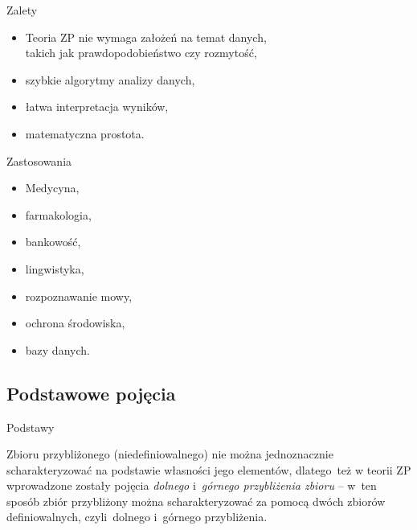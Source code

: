 \documentclass[10pt]{beamer}
\begin{document}
\begin{frame}{Zalety}
\begin{spacing}{1.5}
\begin{itemize}
\item Teoria ZP nie wymaga założeń na temat danych,\\takich jak prawdopodobieństwo czy rozmytość,
\item szybkie algorytmy analizy danych,
\item łatwa interpretacja wyników,
\item matematyczna prostota.
\end{itemize}
\end{spacing}
\end{frame}





\begin{frame}{Zastosowania}
\begin{spacing}{1.5}
\begin{itemize}
\item Medycyna,
\item farmakologia,
\item bankowość,
\item lingwistyka,
\item rozpoznawanie mowy,
\item ochrona środowiska,
\item bazy danych.
\end{itemize}
\end{spacing}
\end{frame}


\subsection{Podstawowe pojęcia}
\begin{frame}{Podstawy}
\begin{spacing}{1.5}
Zbioru przybliżonego (niedefiniowalnego) nie można jednoznacznie scharakteryzować na podstawie własności jego elementów, dlatego~też w teorii ZP wprowadzone zostały pojęcia \textit{dolnego} i~\textit{górnego przybliżenia zbioru} -- w~ten sposób zbiór przybliżony można scharakteryzować za pomocą dwóch zbiorów definiowalnych, czyli~dolnego i~górnego przybliżenia.

\end{spacing}
\end{frame}
\end{document}
